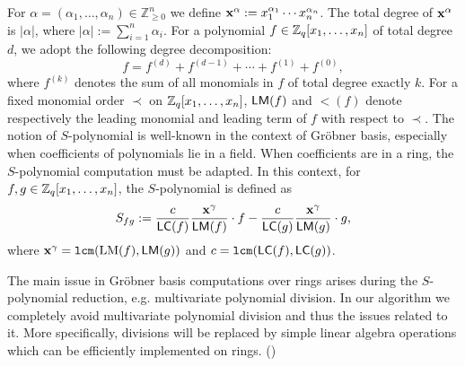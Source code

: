 \label{sec:2background}
For $\alpha = (\alpha_1,\dots,\alpha_n) \in \mathbb{Z}_{\ge 0}^n$ we define $\mathbf{x}^{\alpha} := x_1^{\alpha_1}\cdots x_n^{\alpha_n}$. The total degree of $\mathbf{x}^{\alpha}$ is $|\alpha|$, where $|\alpha| := \sum_{i=1}^n \alpha_i$. For a polynomial $f \in \mathbb{Z}_q[x_1,\dots,x_n]$ of total degree $d$, we adopt the following degree decomposition:
\[
f = f^{(d)} + f^{(d-1)} + \cdots + f^{(1)} + f^{(0)},
\]
where $f^{(k)}$ denotes the sum of all monomials in $f$ of total degree exactly $k$.
For a fixed monomial order $\prec$ on $\mathbb{Z}_q[x_1,\dots,x_n]$, $\mathsf{LM}(f)$ and $\lt(f)$ denote respectively the leading monomial and leading term of $f$ with respect to $\prec$. The notion of $S$-polynomial is well-known in the context of Gr\"obner basis, especially when coefficients of polynomials lie in a field. When coefficients are in a ring, the $S$-polynomial computation must be adapted. %
In this context, for $f, g \in \mathbb{Z}_q[x_1,\dots,x_n]$, the $S$-polynomial is defined as
\begin{equation}\label{eq:spoly-expanded}
    S_{fg} := \frac{c}{\mathsf{LC}(f)}\frac{\mathbf{x}^\gamma}{\mathsf{LM}(f)} \cdot f
              - \frac{c}{\mathsf{LC}(g)}\frac{\mathbf{x}^\gamma}{\mathsf{LM}(g)} \cdot g,
\end{equation}
where $\mathbf{x}^\gamma  = \texttt{lcm}(\mathrm{LM}(f), \mathsf{LM}(g))$ and $c = \texttt{lcm}(\mathsf{LC}(f), \mathsf{LC}(g))$. 

The main issue in Gr\"obner basis computations over rings arises during the $S$-polynomial reduction, e.g. multivariate polynomial division. In our algorithm we completely avoid multivariate polynomial division and thus the issues related to it. More specifically, divisions will be replaced by simple linear algebra operations which can be efficiently implemented on rings. ()


